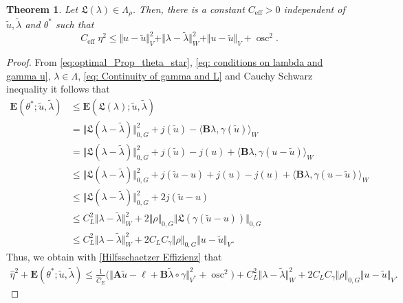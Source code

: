 \documentclass[12pt,twoside,reqno]{amsart}
\newtheorem{theorem}{Theorem}[section]
\theoremstyle{definition}
\numberwithin{equation}{section}
\renewcommand{\L}{\mathfrak{L}}
\newcommand{\A} {\bm{A}}
\newcommand{\lin} {\bm{\ell}}
\newcommand{\B} {\bm{B}}
\newcommand{\E} {\bm{E}}
\newcommand{\norm}[1]    {\Vert #1 \Vert}
\begin{document}
    \begin{theorem}\label{effThm}
     Let $\L(\lambda)\in \Lambda_\rho$. Then,
        there is a constant $C_{\text{eff}}>0$ independent of $\tilde{u},\tilde{\lambda}$ and $\theta^*$ such that
        \begin{equation*}
            C_{\text{eff}}\;\eta^2\leq  \norm{u-\tilde{u}}_V^2 + \norm{{\lambda}-\tilde{\lambda}}_{W}^2 + \norm{u-\tilde{u}}_V+ \operatorname{osc}^2.
        \end{equation*}
    \end{theorem}

   \begin{proof}
         From \eqref{eq:optimal_Prop_theta_star}, \eqref{eq: conditions on lambda and gamma u}, $\lambda\in\Lambda$, \eqref{eq: Continuity of gamma and L} and Cauchy Schwarz inequality it follows that
        \begin{equation*}%
        \begin{split}
            \E(\theta^*;\tilde{u},\tilde{\lambda}) &\leq \E(\L({\lambda});\tilde{u},\tilde{\lambda}) \\
            &= \norm{\L(\lambda-\tilde{\lambda})}_{0,G}^2+j(\tilde{u})-\langle \B\lambda,\gamma(\tilde{u})\rangle_W\\
            &= \norm{\L(\lambda-\tilde{\lambda})}_{0,G}^2+j(\tilde{u})-j(u)+\langle \B\lambda,\gamma(u-\tilde{u})\rangle_W\\
            &\leq \norm{\L(\lambda-\tilde{\lambda})}_{0,G}^2+j(\tilde{u}-u)+j(u)-j(u)+\langle \B\lambda,\gamma(u-\tilde{u})\rangle_W\\
            &\leq \norm{\L(\lambda-\tilde{\lambda})}_{0,G}^2+2j(\tilde{u}-u) \\
            &\leq C_L^2\norm{\lambda-\tilde{\lambda}}_W^2+2\norm{\rho}_{0,G}\norm{\L(\gamma(\tilde{u}-u))}_{0,G}\\
            &\leq C_L^2\norm{\lambda-\tilde{\lambda}}_W^2+2C_LC_\gamma\norm{\rho}_{0,G}\norm{u-\tilde{u}}_V.
         \end{split}
        \end{equation*}
         Thus, we obtain with \eqref{Hilfsschaetzer Effizienz} that
        \begin{multline*}
            \hat{\eta}^2\!+\!\bm{E}(\theta^*;\tilde{u},\tilde{\lambda})\leq\frac{1}{\widehat{C}_E}\Big(\! \norm{\A \tilde{u}\!-\!\lin\!+\!\B\tilde{\lambda}\!\circ\!\gamma}_{V^*}^2\!+\!\operatorname{osc}^2\!\Big)\!+\!C_L^2\norm{\lambda\!-\!\tilde{\lambda}}_W^2\!+\! 2C_LC_\gamma\norm{\rho}_{0,G}\norm{u\!-\!\tilde{u}}_V.

\end{multline*}
\end{proof}
\end{document}
